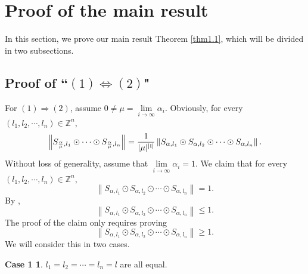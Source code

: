 \documentclass[11pt]{article}
\theoremstyle{plain}
\theoremstyle{definition}
\newtheorem*{case1}{Case 1}
\begin{document}
{\section{Proof of  the main result}

In this section, we prove our main result Theorem \ref{thm1.1}, which will be divided in two subsections.  

\subsection{Proof of ``$(1)\Leftrightarrow (2)$"}


	For	$(1)\Rightarrow (2)$,
assume  $0\not=\mu = \lim\limits_{i \rightarrow \infty}\alpha_i $. Obviously, for every $(l_{1},l_{2},\cdots,l_{n})\in \mathbb{Z}^n,$
$$
\left\|S_{\frac{\alpha}{\mu}, l_1}\odot\cdots\odot S_{\frac{\alpha}{\mu},l_n}\right\|={1\over |\mu|^{|\mathfrak{l}|}}\left\| S_{\alpha,{l_{1}}}\odot S_{\alpha,{l_{2}}}\odot \cdots \odot S_{\alpha,{l_{n}}}\right\|.
$$
Without loss of generality, assume that $\lim\limits_{i\to\infty}\alpha_i=1$. We claim that for every $(l_{1},l_{2},\cdots,l_{n})\in \mathbb{Z}^n,$
		\begin{equation}\label{eq20}
				\left \|  S_{\alpha,{l_{1}}}\odot S_{\alpha,{l_{2}}}\odot \cdots \odot S_{\alpha,{l_{n}}}  \right \|  = 1.
		\end{equation}
		By \cite[Proposition 3.4]{GA},
		$$\left \|  S_{\alpha,{l_{1}}}\odot S_{\alpha,{l_{2}}}\odot \cdots \odot S_{\alpha,{l_{n}}}  \right \|  \le 1.$$
		The proof of the claim only requires proving
		\begin{equation}\label{eq20case}\left \|  S_{\alpha,{l_{1}}}\odot S_{\alpha,{l_{2}}}\odot \cdots \odot S_{\alpha,{l_{n}}}  \right \|  \ge 1.\end{equation}
We will consider this in two cases.
		\begin{case1}
		 $l_{1}=l_{2}=\cdots=l_{n}=l$ are all equal.
	

\end{case1}}
\end{document}
